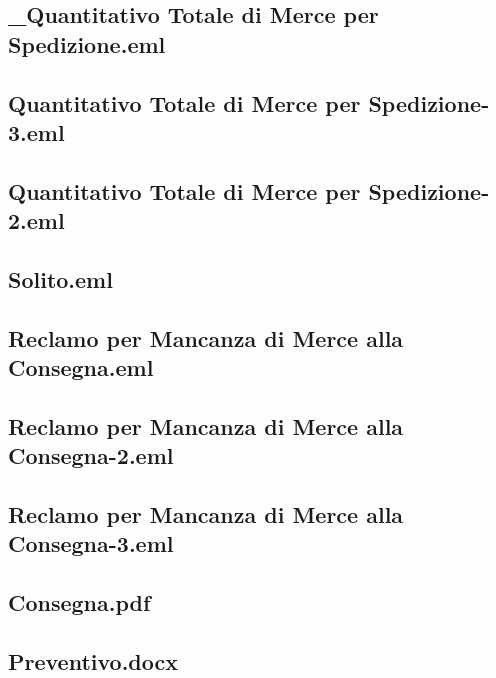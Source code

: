 \documentclass[a4paper,12pt]{report}
\begin{document}
\subsection{\_Quantitativo Totale di Merce per Spedizione.eml}
\vspace{5pt}


\subsection{Quantitativo Totale di Merce per Spedizione-3.eml}
\vspace{5pt}


\subsection{Quantitativo Totale di Merce per Spedizione-2.eml}
\vspace{5pt}


\subsection{Solito.eml}
\vspace{5pt}


\subsection{Reclamo per Mancanza di Merce alla Consegna.eml}
\vspace{5pt}


\subsection{Reclamo per Mancanza di Merce alla Consegna-2.eml}
\vspace{5pt}


\subsection{Reclamo per Mancanza di Merce alla Consegna-3.eml}
\vspace{5pt}


\subsection{Consegna.pdf}
\vspace{5pt}


\subsection{Preventivo.docx}
\vspace{5pt}

\end{document}
